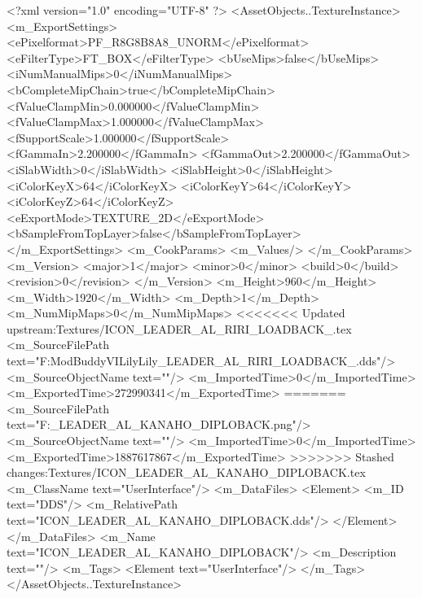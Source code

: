 <?xml version="1.0" encoding="UTF-8" ?>
<AssetObjects..TextureInstance>
	<m_ExportSettings>
		<ePixelformat>PF_R8G8B8A8_UNORM</ePixelformat>
		<eFilterType>FT_BOX</eFilterType>
		<bUseMips>false</bUseMips>
		<iNumManualMips>0</iNumManualMips>
		<bCompleteMipChain>true</bCompleteMipChain>
		<fValueClampMin>0.000000</fValueClampMin>
		<fValueClampMax>1.000000</fValueClampMax>
		<fSupportScale>1.000000</fSupportScale>
		<fGammaIn>2.200000</fGammaIn>
		<fGammaOut>2.200000</fGammaOut>
		<iSlabWidth>0</iSlabWidth>
		<iSlabHeight>0</iSlabHeight>
		<iColorKeyX>64</iColorKeyX>
		<iColorKeyY>64</iColorKeyY>
		<iColorKeyZ>64</iColorKeyZ>
		<eExportMode>TEXTURE_2D</eExportMode>
		<bSampleFromTopLayer>false</bSampleFromTopLayer>
	</m_ExportSettings>
	<m_CookParams>
		<m_Values/>
	</m_CookParams>
	<m_Version>
		<major>1</major>
		<minor>0</minor>
		<build>0</build>
		<revision>0</revision>
	</m_Version>
	<m_Height>960</m_Height>
	<m_Width>1920</m_Width>
	<m_Depth>1</m_Depth>
	<m_NumMipMaps>0</m_NumMipMaps>
<<<<<<< Updated upstream:Textures/ICON_LEADER_AL_RIRI_LOADBACK_.tex
	<m_SourceFilePath text="F:\1\Firaxis ModBuddy\Civilization VI\Assault Lily\Assault Lily\Textures\ICON_LEADER_AL_RIRI_LOADBACK_.dds"/>
	<m_SourceObjectName text=""/>
	<m_ImportedTime>0</m_ImportedTime>
	<m_ExportedTime>272990341</m_ExportedTime>
=======
	<m_SourceFilePath text="F:\DT\lilyimages\all\ICON_LEADER_AL_KANAHO_DIPLOBACK.png"/>
	<m_SourceObjectName text=""/>
	<m_ImportedTime>0</m_ImportedTime>
	<m_ExportedTime>1887617867</m_ExportedTime>
>>>>>>> Stashed changes:Textures/ICON_LEADER_AL_KANAHO_DIPLOBACK.tex
	<m_ClassName text="UserInterface"/>
	<m_DataFiles>
		<Element>
			<m_ID text="DDS"/>
			<m_RelativePath text="ICON_LEADER_AL_KANAHO_DIPLOBACK.dds"/>
		</Element>
	</m_DataFiles>
	<m_Name text="ICON_LEADER_AL_KANAHO_DIPLOBACK"/>
	<m_Description text=""/>
	<m_Tags>
		<Element text="UserInterface"/>
	</m_Tags>
</AssetObjects..TextureInstance>

